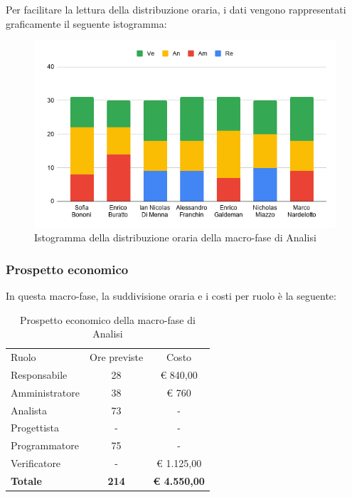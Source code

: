 \documentclass[../piano-di-progetto.tex]{subfiles}
\begin{document}
  Per facilitare la lettura della distribuzione oraria, i dati vengono rappresentati graficamente il seguente istogramma:
  \begin{figure}[H]
    \centering
    \includegraphics[width=12cm]{img/ore-analisi.png}
    \caption{Istogramma della distribuzione oraria della macro-fase di Analisi}
    \label{fig:ore-componente-analisi}
  \end{figure}

  \subsubsection{Prospetto economico}
  In questa macro-fase, la suddivisione oraria e i costi per ruolo è la seguente:

  \begin{table}[H]
    \centering
    \begin{tabular}{lcc}
      Ruolo           & Ore previste & Costo      \\
      Responsabile    & 28           & € 840,00          \\
      Amministratore  & 38            & € 760          \\
      Analista        & 73            & -          \\
      Progettista     & -            & -          \\
      Programmatore   & 75            & -          \\
      Verificatore    & -            & € 1.125,00          \\
      \textbf{Totale} & \textbf{214}   & \textbf{€ 4.550,00}
    \end{tabular}
    \caption{Prospetto economico della macro-fase di Analisi}
  \end{table}
\end{document}
